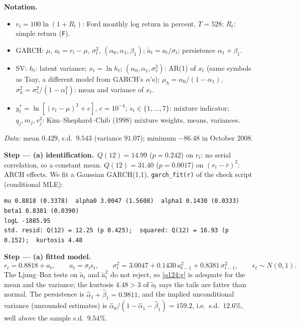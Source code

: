 \documentclass[11pt,a4paper]{article}
\newenvironment{notacao}{\par\smallskip\noindent\textbf{Notation.}\begin{itemize}[leftmargin=1.4em,topsep=1pt,itemsep=0pt]\small}{\end{itemize}}
\newcommand{\passo}[2]{\par\smallskip\noindent\textbf{Step --- #1.}~#2}
\begin{document}
\begin{sol}
\begin{notacao}
\item $r_t=100\ln(1+R_t)$: Ford monthly log return in percent, $T=528$; $R_t$: simple return (\texttt{F}).
\item GARCH: $\mu$, $a_t=r_t-\mu$, $\sigma_t^2$, $(\alpha_0,\alpha_1,\beta_1)$; $\tilde a_t=a_t/\sigma_t$; persistence $\alpha_1+\beta_1$.
\item SV: $h_t$: latent variance; $x_t=\ln h_t$; $(\alpha_0,\alpha_1,\sigma_v^2)$: AR(1) of $x_t$ (same symbols as Tsay, a different model from GARCH's $\alpha$'s); $\mu_h=\alpha_0/(1-\alpha_1)$, $\sigma_h^2=\sigma_v^2/(1-\alpha_1^2)$: mean and variance of $x_t$.
\item $y_t^*=\ln[(r_t-\mu)^2+c]$, $c=10^{-4}$; $s_t\in\{1,\dots,7\}$: mixture indicator; $q_j,m_j,v_j^2$: Kim--Shephard--Chib (1998) mixture weights, means, variances.
\end{notacao}
\noindent\textit{Data:} mean $0.429$, s.d.\ $9.543$ (variance $91.07$); minimum $-86.48$ in October 2008.

\passo{(a) identification}{$Q(12)=14.99$ ($p=0.242$) on $r_t$: no serial correlation, so a constant mean.
$Q(12)=31.40$ ($p=0.0017$) on $(r_t-\bar r)^2$: ARCH effects. We fit a Gaussian GARCH(1,1),
\texttt{garch\_fit(r)} of the check script (conditional MLE):}
\begingroup\footnotesize
\begin{verbatim}
mu 0.8818 (0.3378)  alpha0 3.0047 (1.5608)  alpha1 0.1430 (0.0333)  beta1 0.8381 (0.0390)
logL -1885.95
std. resid: Q(12) = 12.25 (p 0.425);  squared: Q(12) = 16.93 (p 0.152);  kurtosis 4.48
\end{verbatim}
\endgroup
\passo{(a) fitted model}{}
\begin{equation}\label{q124:g} r_t=0.8818+a_t,\qquad a_t=\sigma_t\epsilon_t,\qquad \sigma_t^2=3.0047+0.1430\,a_{t-1}^2+0.8381\,\sigma_{t-1}^2,\qquad \epsilon_t\sim N(0,1). \end{equation}
The Ljung--Box tests on $\tilde a_t$ and $\tilde a_t^2$ do not reject, so \eqref{q124:g} is adequate for the
mean and the variance; the kurtosis $4.48>3$ of $\tilde a_t$ says the tails are fatter than normal. The
persistence is $\hat\alpha_1+\hat\beta_1=0.9811$, and the implied unconditional variance (unrounded estimates) is
$\hat\alpha_0/(1-\hat\alpha_1-\hat\beta_1)=159.2$, i.e.\ s.d.\ $12.6\%$, well above the sample s.d.\ $9.54\%$.


\end{sol}
\end{document}
